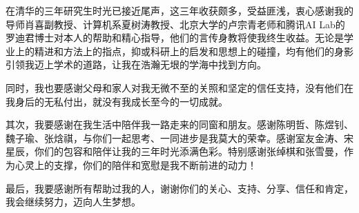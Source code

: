 
\begin{acknowledgements}
在清华的三年研究生时光已接近尾声，这三年收获颇多，受益匪浅，衷心感谢我的导师肖喜副教授、计算机系夏树涛教授、北京大学的卢宗青老师和腾讯AI Lab的罗迪君博士对本人的帮助和精心指导，他们的言传身教将使我终生收益。无论是学业上的精进和方法上的指点，抑或科研上的启发和思想上的碰撞，均有他们的身影引领我迈上学术的道路，让我在浩瀚无垠的学海中找到方向。

同时，我也要感谢父母和家人对我无微不至的关照和坚定的信任支持，没有他们在我身后的无私付出，就没有我成长至今的一切成就。

其次，我要感谢在我生活中陪伴我一路走来的同窗和朋友。感谢陈明哲、陈煜钊、魏子瑜、张焓祺，与你们一起思考、一同进步是我莫大的荣幸。感谢室友金涛、宋星辰，你们的包容和陪伴让我的三年时光添满色彩。特别感谢张绰棋和张雪曼，作为心灵上的支撑，你们的陪伴和宽慰是我不断前进的动力！

最后，我要感谢所有帮助过我的人，谢谢你们的关心、支持、分享、信任和肯定，我会继续努力，迈向人生梦想。
\end{acknowledgements}
